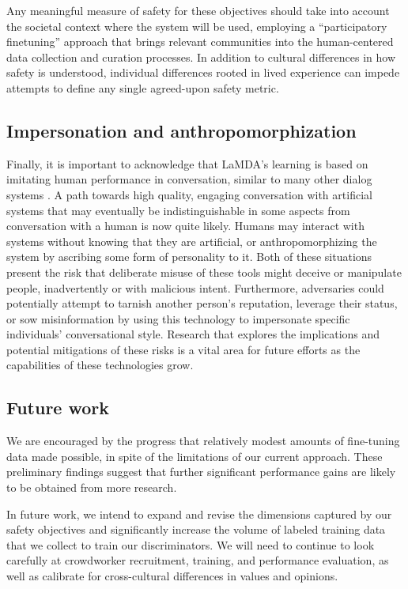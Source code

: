 Any meaningful measure of safety for these objectives should take into account the societal context where the system will be used, employing a “participatory finetuning” approach that brings relevant communities into the human-centered data collection and curation processes. In addition to cultural differences in how safety is understood, individual differences rooted in lived experience can impede attempts to define any single agreed-upon safety metric.

\subsection{Impersonation and anthropomorphization} Finally, it is important to acknowledge that LaMDA’s learning is based on imitating human performance in conversation, similar to many other dialog systems \cite{adiwardana2020humanlike,blenderbot}. A path towards high quality, engaging conversation with artificial systems that may eventually be indistinguishable in some aspects from conversation with a human is now quite likely. Humans may interact with systems without knowing that they are artificial, or anthropomorphizing the system by ascribing some form of personality to it. Both of these situations present the risk that deliberate misuse of these tools might deceive or manipulate people, inadvertently or with malicious intent. Furthermore, adversaries could potentially attempt to tarnish another person’s reputation, leverage their status, or sow misinformation by using this technology to impersonate specific individuals' conversational style. Research that explores the implications and potential mitigations of these risks is a vital area for future efforts as the capabilities of these technologies grow.

\subsection{Future work} We are encouraged by the progress that relatively modest amounts of fine-tuning data made possible, in spite of the limitations of our current approach. These preliminary findings suggest that further significant performance gains are likely to be obtained from more research.

In future work, we intend to expand and revise the dimensions captured by our safety objectives and significantly increase the volume of labeled training data that we collect to train our discriminators. We will need to continue to look carefully at crowdworker recruitment, training, and performance evaluation, as well as calibrate for cross-cultural differences in values and opinions.

